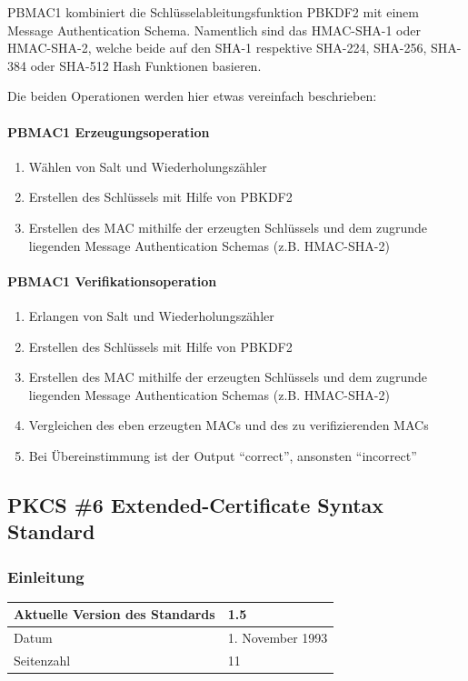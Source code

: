 \documentclass[10pt,a4paper]{article}
\begin{document}
PBMAC1 kombiniert die Schlüsselableitungsfunktion PBKDF2 mit einem Message Authentication
Schema. Namentlich sind das HMAC-SHA-1 oder HMAC-SHA-2, welche beide auf den SHA-1
respektive SHA-224, SHA-256, SHA-384 oder SHA-512 Hash Funktionen basieren.

Die beiden Operationen werden hier etwas vereinfach beschrieben:

\paragraph{PBMAC1 Erzeugungsoperation}
\begin{enumerate}
    \item Wählen von Salt und Wiederholungszähler
    \item Erstellen des Schlüssels mit Hilfe von PBKDF2
    \item Erstellen des MAC mithilfe der erzeugten Schlüssels und dem zugrunde liegenden
        Message Authentication Schemas (z.B. HMAC-SHA-2)
\end{enumerate}

\paragraph{PBMAC1 Verifikationsoperation}
\begin{enumerate}
    \item Erlangen von Salt und Wiederholungszähler
    \item Erstellen des Schlüssels mit Hilfe von PBKDF2
    \item Erstellen des MAC mithilfe der erzeugten Schlüssels und dem zugrunde liegenden
        Message Authentication Schemas (z.B. HMAC-SHA-2)
    \item Vergleichen des eben erzeugten MACs und des zu verifizierenden MACs
    \item Bei Übereinstimmung ist der Output "`correct"', ansonsten "`incorrect"'
\end{enumerate}

\subsection{PKCS \#6 Extended-Certificate Syntax Standard}

\subsubsection{Einleitung}
\begin{table}[ht]
    \centering
    \begin{tabular}{|l|l|} \hline
        Aktuelle Version des Standards & 1.5 \\\hline
        Datum & 1. November 1993 \\\hline
        Seitenzahl & 11 \\\hline
    \end{tabular}
\end{table}
\end{document}
